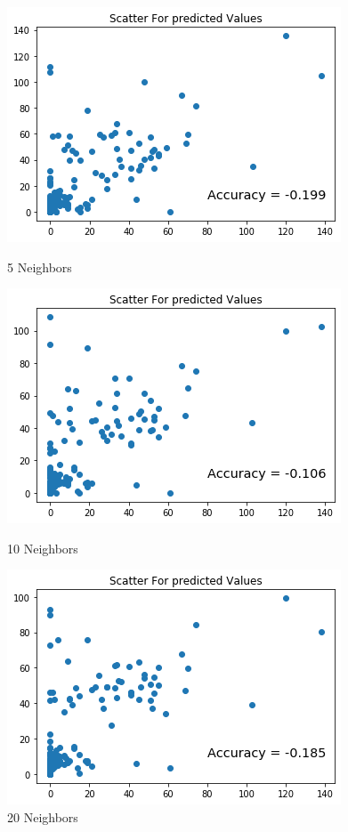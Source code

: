 \documentclass{report}
\begin{document}
\begin{figure}[!htb]
  \includegraphics[width=\linewidth]{KNN5Nei.png}
  \caption{5 Neighbors}\label{fig:KNN5Nei}
\endminipage\hfill
{}
  \includegraphics[width=\linewidth]{KNN10Nei.png}
  \caption{10 Neighbors}\label{fig:KNN10Nei}
\endminipage\hfill
{}%
  \includegraphics[width=\linewidth]{KNN20Nei.png}
  \caption{20 Neighbors}\label{fig:KNN20Nei}
\endminipage
\end{figure}
\end{document}
